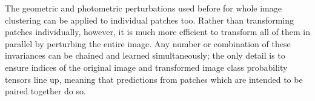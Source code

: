 

The geometric and photometric perturbations used before for whole image clustering can be applied to individual patches too.
Rather than transforming patches individually, however, it is much more efficient to transform all of them in parallel by perturbing the entire image.
Any number or combination of these invariances can be chained and learned simultaneously; the only detail is to ensure indices of the original image and transformed image class probability tensors line up, meaning that predictions from patches which are intended to be paired together do so.

